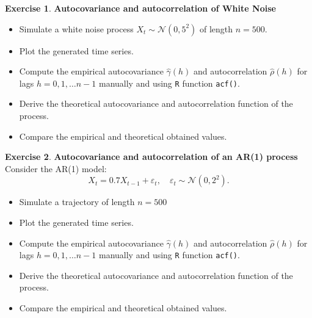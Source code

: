 \documentclass[a4,a4paper,10pt,notitlepage,english]{article}
\theoremstyle{definition}
\newtheorem{exo}{Exercise}
\begin{document}
	
	\begin{exo}
    \textbf{Autocovariance and autocorrelation of White Noise}\\




  
    \begin{itemize}
    \item     Simulate a white noise process $X_t \sim \mathcal{N}(0,5^2)$ of length $n=500$.
    \item Plot the generated time series.
        \item Compute the empirical autocovariance $\hat{\gamma}(h)$ and autocorrelation $\hat{\rho}(h)$
        for lags $h=0,1, \ldots n-1$ manually and using \texttt{R} function \texttt{acf()}.
        \item Derive the theoretical autocovariance and autocorrelation function of the process.
        \item Compare the empirical and theoretical obtained values.
    \end{itemize}
\end{exo}

\bigskip

\begin{exo}
    \textbf{Autocovariance and autocorrelation of an AR(1) process}\\

    Consider the AR(1) model:
    \[
    X_t = 0.7 X_{t-1} + \varepsilon_t, \quad \varepsilon_t \sim \mathcal{N}(0,2^2).
    \]

    \begin{itemize}
    \item Simulate a trajectory of length $n=500$
 \item Plot the generated time series.         
         \item Compute the empirical autocovariance $\hat{\gamma}(h)$ and autocorrelation $\hat{\rho}(h)$
        for lags $h=0,1, \ldots n-1$ manually and using \texttt{R} function \texttt{acf()}.
        \item Derive the theoretical autocovariance and autocorrelation function of the process.
        \item Compare the empirical and theoretical obtained values.
  
    \end{itemize}
\end{exo}

\bigskip
\end{document}
